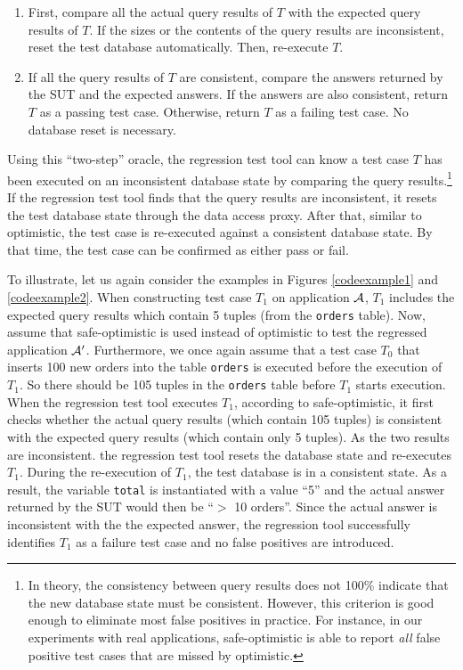 \documentclass[authoryear,preprint,12pt]{elsarticle}
\begin{document}
\begin{enumerate}
\item First, compare all the actual query results of $T$ with the expected query results of $T$.  
      If the sizes or the contents of the query results are inconsistent, reset the test database automatically. Then, re-execute $T$.
      
\item If all the query results of $T$ are consistent, 
      compare the answers returned by the SUT and the expected answers.  
      If the answers are also consistent, return $T$ as a passing test case.
      Otherwise, return $T$ as a failing test case.  
      No database reset is necessary.
\end{enumerate}

Using this ``two-step'' oracle, 
the regression test tool can know a test case $T$ has been executed on 
an inconsistent database state by comparing the query results.\footnote{In theory, the consistency between query results
does not 100\% indicate that the new database state must be consistent.
However, this criterion is good enough to eliminate most false positives in practice.  
For instance, in our experiments with real applications, 
{\sc safe-optimistic} is able to report \emph{all} false positive test cases that are missed by {\sc optimistic}.}
If the regression test tool finds that the query results are inconsistent,
it resets the test database state through the
data access proxy.  
After that, similar to {\sc optimistic}, 
the test case is re-executed against a consistent database state.
By that time, the test case can be confirmed as either pass or fail.  

To illustrate, let us again consider the examples in Figures \ref{codeexample1} and \ref{codeexample2}.
When constructing test case $T_1$ on application $\cal{A}$,
$T_1$ includes the expected query results which contain 5 tuples (from the \texttt{orders} table).
Now, assume that {\sc safe-optimistic} is used instead of  {\sc optimistic} to test 
the regressed application $\cal{A}'$.
Furthermore, we once again assume that a test case $T_0$ that inserts 100 new orders into the table \texttt{orders} is executed before the execution of $T_1$.
So there should be 105 tuples in the \texttt{orders} table before $T_1$ starts execution.
When the regression test tool executes $T_1$,
according to {\sc safe-optimistic}, 
it first checks whether the actual query results (which contain 105 tuples) 
is consistent with the expected query results (which contain only 5 tuples).
As the two results are inconsistent.
the regression test tool resets the database state and re-executes $T_1$.
During the re-execution of $T_1$, 
the test database is in a consistent state.
As a result, the variable {\tt total} is instantiated with a value ``5''
and the actual answer returned by the SUT would then be ``$>$ 10 orders''.
Since the actual answer is inconsistent with the the expected answer,
the regression tool successfully identifies $T_1$ as a failure test case and 
no false positives are introduced.
\end{document}
